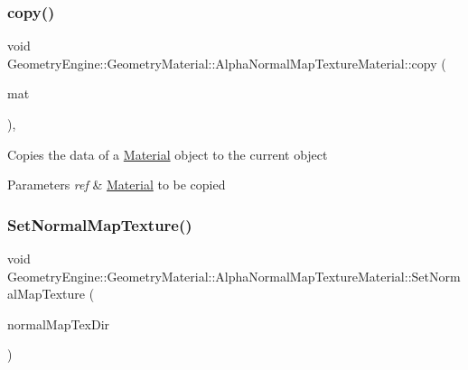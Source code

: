 \subsubsection{\texorpdfstring{copy()}{copy()}}
{\footnotesize\ttfamily void Geometry\+Engine\+::\+Geometry\+Material\+::\+Alpha\+Normal\+Map\+Texture\+Material\+::copy (\begin{DoxyParamCaption}\item[{const \mbox{\hyperlink{class_geometry_engine_1_1_geometry_material_1_1_alpha_normal_map_texture_material}{Alpha\+Normal\+Map\+Texture\+Material}} \&}]{mat }\end{DoxyParamCaption})\hspace{0.3cm}{\ttfamily [protected]}, {\ttfamily [virtual]}}

Copies the data of a \mbox{\hyperlink{class_geometry_engine_1_1_geometry_material_1_1_material}{Material}} object to the current object 
\begin{DoxyParams}{Parameters}
{\em ref} & \mbox{\hyperlink{class_geometry_engine_1_1_geometry_material_1_1_material}{Material}} to be copied \\
\hline
\end{DoxyParams}
\mbox{\label{class_geometry_engine_1_1_geometry_material_1_1_alpha_normal_map_texture_material_a188ebcb934a89af6c130a0a787aa1c1e}} 
\subsubsection{\texorpdfstring{SetNormalMapTexture()}{SetNormalMapTexture()}}
{\footnotesize\ttfamily void Geometry\+Engine\+::\+Geometry\+Material\+::\+Alpha\+Normal\+Map\+Texture\+Material\+::\+Set\+Normal\+Map\+Texture (\begin{DoxyParamCaption}\item[{const std\+::string \&}]{normal\+Map\+Tex\+Dir }\end{DoxyParamCaption})}

